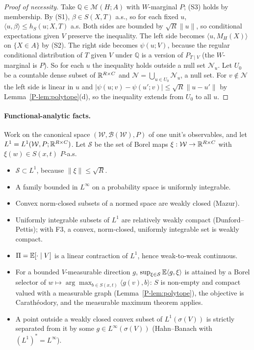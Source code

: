 \begin{proof}[Proof of necessity]
Take $\mathbb Q\in\mathcal M(H;A)$ with $W$-marginal $P$; (S3) holds by membership.
By (S1), $\beta\in S(X,T)$ a.s., so for each fixed $u$,
$\langle u,\beta\rangle\le h_S(u;X,T)$ a.s. Both sides are bounded by
$\sqrt R\|u\|$, so conditional expectations given $V$ preserve the inequality. The
left side becomes $\langle u,M_H(X)\rangle$ on $\{X\in A\}$ by (S2). The right side
becomes $\psi(u;V)$, because the regular conditional distribution of $T$ given $V$
under $\mathbb Q$ is a version of $P_{T\mid V}$ (the $W$-marginal is $P$). So for each
$u$ the inequality holds outside a null set $\mathcal N_u$. Let $U_0$ be a countable
dense subset of $\mathbb R^{R\times C}$ and $\mathcal N=\bigcup_{u\in U_0}\mathcal N_u$, a
null set. For $v\notin\mathcal N$ the left side is linear in $u$ and
$|\psi(u;v)-\psi(u';v)|\le\sqrt R\|u-u'\|$ by Lemma~\ref{P-lem:polytope}(d), so the
inequality extends from $U_0$ to all $u$.
\end{proof}

\paragraph{Functional-analytic facts.} Work on the canonical space
$(\mathcal W,\mathcal B(\mathcal W),P)$ of one unit's observables, and let
$L^1=L^1(\mathcal W,P;\mathbb R^{R\times C})$. Let $\mathcal S$ be the set of Borel maps
$\xi:\mathcal W\to\mathbb R^{R\times C}$ with $\xi(w)\in S(x,t)$ $P$-a.s.
\begin{itemize}
\item[F1] $\mathcal S\subset L^1$, because $\|\xi\|\le\sqrt R$.
\item[F2] A family bounded in $L^\infty$ on a probability space is uniformly
integrable.
\item[F3] Convex norm-closed subsets of a normed space are weakly closed (Mazur).
\item[F4] Uniformly integrable subsets of $L^1$ are relatively weakly compact
(Dunford--Pettis); with F3, a convex, norm-closed, uniformly integrable set is weakly
compact.
\item[F5] $\Pi=\mathbb E[\cdot\mid V]$ is a linear contraction of $L^1$, hence
weak-to-weak continuous.
\item[F6] For a bounded $V$-measurable direction $g$,
$\sup_{\xi\in\mathcal S}\mathbb E\langle g,\xi\rangle$ is attained by a Borel selector of
$w\mapsto\arg\max_{b\in S(x,t)}\langle g(v),b\rangle$: $S$ is non-empty and compact
valued with a measurable graph (Lemma~\ref{P-lem:polytope}), the objective is
Carathéodory, and the measurable maximum theorem applies.
\item[F7] A point outside a weakly closed convex subset of $L^1(\sigma(V))$ is strictly
separated from it by some $g\in L^\infty(\sigma(V))$ (Hahn--Banach with
$(L^1)^*=L^\infty$).
\end{itemize}

